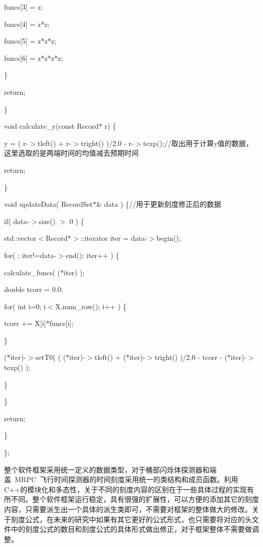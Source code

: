 \quad\quad\quad      funcs[3] = z;

\quad\quad\quad      funcs[4] = z*z;

\quad\quad\quad      funcs[5] = z*z*z;

\quad\quad\quad      funcs[6] = z*z*z*z;

\quad\quad    \}

\quad\quad    return;

\quad\quad  \}

\quad  void calculate\_y(const Record$*$ r) \{

\quad\quad    y = ( r-$>$tleft() + r-$>$tright() )/2.0 - r-$>$texp();//取出用于计算y值的数据，这里选取的是两端时间的均值减去预期时间

\quad\quad    return;

\quad  \}

\quad  void updateData( RecordSet$*$\& data ) \{//用于更新刻度修正后的数据

\quad\quad    if( data-$>$size() $>$ 0 ) \{

\quad\quad\quad      std::vector$<$Record$*>$::iterator iter = data-$>$begin();

\quad\quad\quad      for( ; iter!=data-$>$end(); iter++ ) \{

\quad\quad\quad\quad        calculate\_funcs( ($*$iter) );

\quad\quad\quad\quad        double tcorr = 0.0;

\quad\quad\quad\quad        for( int i=0; i$<$X.num\_row(); i++ ) \{

\quad\quad\quad\quad\quad          tcorr += X[i]$*$funcs[i];

\quad\quad\quad\quad        \}

\quad\quad\quad\quad        ($*$iter)-$>$setT0( ( ($*$iter)-$>$tleft() + ($*$iter)-$>$tright() )/2.0 - tcorr - ($*$iter)-$>$texp() );

\quad\quad\quad      \}

\quad\quad    \}

    return;

\quad  \}
  
\};

整个软件框架采用统一定义的数据类型，对于桶部闪烁体探测器和端盖~MRPC~飞行时间探测器的时间刻度采用统一的类结构和成员函数。利用C++的模块化和多态性，关于不同的刻度内容的区别在于一些具体过程的实现有所不同。整个软件框架运行稳定，具有很强的扩展性，可以方便的添加其它的刻度内容，只需要派生出一个具体的派生类即可，不需要对框架的整体做大的修改。关于刻度公式，在未来的研究中如果有其它更好的公式形式，也只需要将对应的头文件中的刻度公式的数目和刻度公式的具体形式做出修正，对于框架整体不需要做调整。

